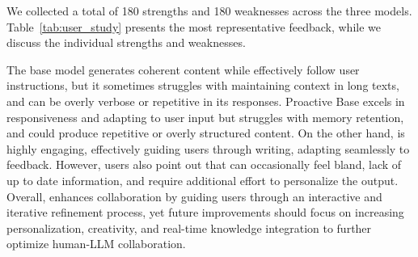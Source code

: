 % 

 We collected a total of 180 strengths and 180 weaknesses across the three models. Table~\ref{tab:user_study} presents the most representative feedback, while we discuss the individual strengths and weaknesses.

The base model generates coherent content while effectively follow user instructions, but it sometimes struggles with maintaining context in long texts, and can be overly verbose or repetitive in its responses. 
Proactive Base excels in responsiveness and adapting to user input but struggles with memory retention, and could produce repetitive or overly structured content.
On the other hand, \name{} is highly engaging, effectively guiding users through writing, adapting seamlessly to feedback. However, users also point out that \name{} can occasionally feel bland, lack of up to date information, and require additional effort to personalize the output. 
Overall, \name{} enhances collaboration by guiding users through an interactive and iterative refinement process, yet future improvements should focus on increasing personalization, creativity, and real-time knowledge integration to further optimize human-LLM collaboration.
    






